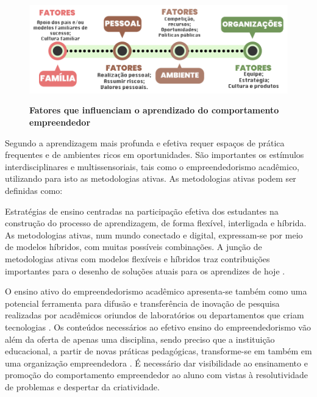 \begin{figure}[H]
\centering
\caption{\textbf{Fatores que influenciam o aprendizado do comportamento empreendedor}}
\includegraphics[scale=0.8]{Imagens/esquema_influencias_empreendedorismo.png}
\label{figura_2}
\end{figure}


Segundo  a aprendizagem mais profunda e efetiva requer espaços de prática frequentes e de ambientes ricos em oportunidades.  São importantes os estímulos interdisciplinares e multissensoriais, tais como o empreendedorismo acadêmico, utilizando para isto as metodologias ativas. As metodologias ativas podem ser definidas como:

\begin{citacao}
Estratégias de ensino centradas na participação efetiva dos estudantes na construção do processo de aprendizagem, de forma flexível, interligada e híbrida. As metodologias ativas, num mundo conectado e digital, expressam-se por meio de modelos híbridos, com muitas possíveis combinações. A junção de metodologias ativas com modelos flexíveis e híbridos traz contribuições importantes para o desenho de soluções atuais para os aprendizes de hoje \cite{bacich_metodologias_2018}.
\end{citacao}

O ensino ativo do empreendedorismo acadêmico apresenta-se também como uma potencial ferramenta para difusão e transferência de inovação de pesquisa realizadas por acadêmicos oriundos de laboratórios ou departamentos que criam tecnologias \cite{guo_what_2019, abreu_nature_2013}. Os conteúdos necessários ao efetivo ensino do empreendedorismo vão além da oferta de apenas uma disciplina, sendo preciso que a instituição educacional, a partir de novas práticas pedagógicas, transforme-se em também em uma organização empreendedora \cite{campelli_empreendedorismo_2011}. É necessário dar visibilidade ao ensinamento e promoção do comportamento empreendedor ao aluno com vistas à resolutividade de problemas \cite{degen_o_1989} e despertar da criatividade.

